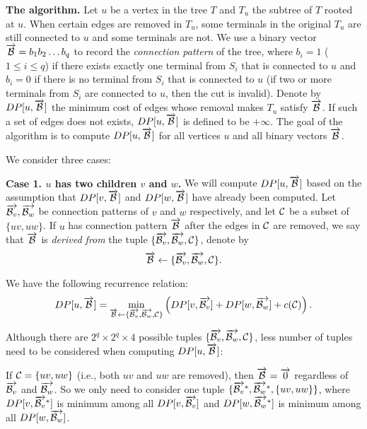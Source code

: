 \documentclass[11pt]{article}
\begin{document}
{\bf The algorithm.}
Let $u$ be a vertex in the tree $T$ and $T_u$ the subtree of $T$ rooted at $u$. When certain edges are removed in $T_u$, some terminals in the original $T_u$
are still connected to $u$ and some terminals are not. We use a binary vector $\overrightarrow{{\cal B}} = b_1b_2\ldots b_q$ to record the {\em connection pattern} of the tree, where $b_i = 1$ ($1 \leq i \leq q$) if there exists exactly one terminal from
$S_i$ that is connected to $u$ and $b_i = 0$ if there is no terminal from $S_i$ that is connected to $u$ (if two or more terminals from $S_i$ are connected to $u$, then the cut is invalid). Denote by $DP[u, \overrightarrow{{\cal B}}]$ the minimum cost of edges whose removal makes $T_u$ satisfy $\overrightarrow{{\cal B}}$. If such a set of edges does not exists, $DP[u, \overrightarrow{{\cal B}}]$ is defined to be $+\infty$. The goal of the algorithm is to compute $DP[u, \overrightarrow{{\cal B}}]$ for all vertices $u$ and all binary vectors $\overrightarrow{{\cal B}}$.

We consider three cases:

{\bf Case 1. $u$ has two children $v$ and $w$.} We will compute $DP[u, \overrightarrow{{\cal B}}]$ based on the assumption that $DP[v, \overrightarrow{{\cal B}}]$ and $DP[w, \overrightarrow{{\cal B}}]$
have already been computed. Let $\overrightarrow{{\cal B}_{v}}, \overrightarrow{{\cal B}_{w}}$ be connection patterns of $v$ and $w$ respectively, and let ${\cal C}$ be a subset of $\{uv,uw\}$. If $u$ has connection pattern $\overrightarrow{{\cal B}}$ after the edges in ${\cal C}$ are removed, we say that $\overrightarrow{{\cal B}}$ is {\em derived from} the tuple $\{\overrightarrow{{\cal B}_{v}}, \overrightarrow{{\cal B}_{w}}, {\cal C}\}$, denote by $$\overrightarrow{{\cal B}} \leftarrow \{\overrightarrow{{\cal B}_{v}}, \overrightarrow{{\cal B}_{w}}, {\cal C}\}.$$

We have the following recurrence relation:
$$DP[u, \overrightarrow{{\cal B}}] = \min_{\overrightarrow{{\cal B}} \leftarrow \{\overrightarrow{{\cal B}_{v}}, \overrightarrow{{\cal B}_{w}}, {\cal C}\}} \left(DP[v, \overrightarrow{{\cal B}_{v}}] + DP[w, \overrightarrow{{\cal B}_{w}}] + c({\cal C})\right).$$

Although there are $2^q\times 2^q \times 4$ possible tuples
$\{\overrightarrow{{\cal B}_{v}}, \overrightarrow{{\cal B}_{w}}, {\cal C}\}$, less number of tuples need to be considered when computing $DP[u, \overrightarrow{{\cal B}}]$:

If ${\cal C} =\{uv,uw\}$ (i.e., both $uv$ and $uw$ are removed), then $\overrightarrow{{\cal B}} = \overrightarrow{0}$ regardless of $\overrightarrow{{\cal B}_{v}}$ and $\overrightarrow{{\cal B}_{w}}$. So we only need to consider one tuple $\{\overrightarrow{{\cal B}_{v}}^*, \overrightarrow{{\cal B}_{w}}^*, \{uv,uw\}\}$, where $DP[v, \overrightarrow{{\cal B}_{v}}^*]$ is minimum among all $DP[v, \overrightarrow{{\cal B}_{v}}]$ and $DP[w, \overrightarrow{{\cal B}_{w}}^*]$ is minimum among all $DP[w, \overrightarrow{{\cal B}_{w}}]$.
\end{document}
